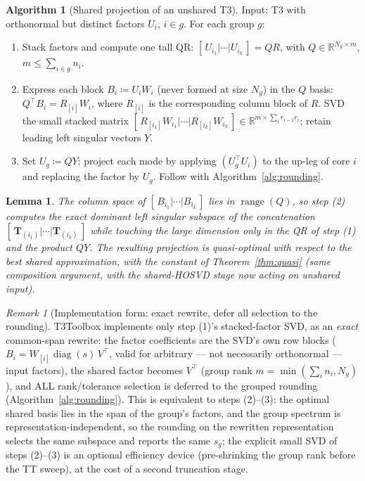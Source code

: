 \documentclass[11pt]{article}
\newtheorem{lemma}[theorem]{Lemma}
\theoremstyle{definition}
\newtheorem{algorithm}[theorem]{Algorithm}
\theoremstyle{remark}
\newtheorem{remark}[theorem]{Remark}
\newcommand{\R}{\mathbb{R}}
\newcommand{\T}{\boldsymbol{T}}
\begin{document}
\begin{algorithm}[Shared projection of an unshared T3]\label{alg:init}
Input: T3 with orthonormal but distinct factors $U_i$, $i \in g$.
For each group $g$:
\begin{enumerate}[label=\emph{(\arabic*)},itemsep=1pt,topsep=2pt]
\item Stack factors and compute one tall QR:
  $[\,U_{i_1} | \cdots | U_{i_k}\,] = Q R$, with
  $Q \in \R^{N_g \times m}$, $m \leq \sum_{i\in g} n_i$.
\item Express each block $B_i \coloneqq U_i W_i$ (never formed at size
  $N_g$) in the $Q$ basis: $Q^\top B_i = R_{[i]} W_i$, where $R_{[i]}$ is the
  corresponding column block of $R$. SVD the small stacked matrix
  $[\,R_{[i_1]} W_{i_1} | \cdots | R_{[i_k]} W_{i_k}\,] \in
  \R^{m \times \sum_i r_{i-1} r_i}$; retain leading left singular vectors
  $Y$.
\item Set $U_g \coloneqq Q Y$; project each mode by applying
  $(U_g^\top U_i)$ to the up-leg of core $i$ and replacing the factor by
  $U_g$. Follow with Algorithm~\ref{alg:rounding}.
\end{enumerate}
\end{algorithm}

\begin{lemma}\label{lem:init}
The column space of $[\,B_{i_1} | \cdots | B_{i_k}\,]$ lies in
$\operatorname{range}(Q)$, so step (2) computes the exact dominant left
singular subspace of the concatenation $[\,\T_{(i_1)}|\cdots|\T_{(i_k)}\,]$
while touching the large dimension only in the QR of step (1) and the product
$QY$. The resulting projection is quasi-optimal with respect to the best
shared approximation, with the constant of Theorem~\ref{thm:quasi} (same
composition argument, with the shared-HOSVD stage now acting on unshared
input).
\end{lemma}

\begin{remark}[Implementation form: exact rewrite, defer all selection to the
rounding]
T3Toolbox implements only step (1)'s stacked-factor SVD, as an \emph{exact}
common-span rewrite: the factor coefficients are the SVD's own row blocks
($B_i = W_{[i]} \operatorname{diag}(s)\, V^\top$, valid for arbitrary --- not
necessarily orthonormal --- input factors), the shared factor becomes
$V^\top$ (group rank $m = \min(\sum_i n_i, N_g)$), and ALL rank/tolerance
selection is deferred to the grouped rounding
(Algorithm~\ref{alg:rounding}). This is equivalent to steps (2)--(3): the
optimal shared basis lies in the span of the group's factors, and the group
spectrum is representation-independent, so the rounding on the rewritten
representation selects the same subspace and reports the same $s_g$; the
explicit small SVD of steps (2)--(3) is an optional efficiency device
(pre-shrinking the group rank before the TT sweep), at the cost of a second
truncation stage.
\end{remark}
\end{document}
